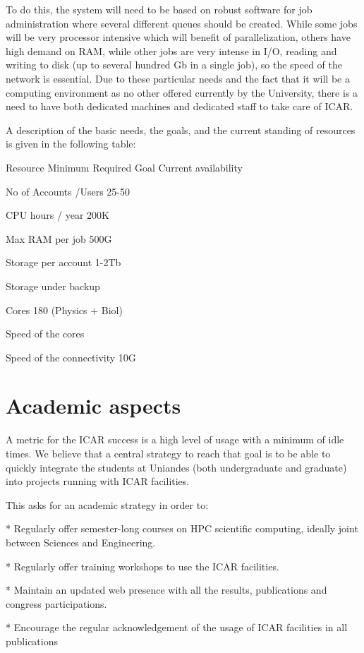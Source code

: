 \documentclass{article}
\begin{document}
To do this, the system will need to be based on robust software for job administration where several different queues should be created. While some jobs will be very processor intensive which will benefit of parallelization, others have high demand on RAM, while other jobs are very intense in I/O, reading and writing to disk (up to several hundred Gb in a single job), so the speed of the network is essential. Due to these particular needs and the fact that it will be a computing environment as no other offered currently by the University, there is a need to have both dedicated machines and dedicated staff to take care of ICAR.

A description of the basic needs, the goals, and the current standing of resources is given in the following table:

Resource Minimum Required Goal Current availability

No of Accounts /Users 25-50

CPU hours / year 200K

Max RAM per job 500G

Storage per account 1-2Tb

Storage under backup

Cores 180 (Physics + Biol)

Speed of the cores

Speed of the connectivity 10G

\section{Academic aspects}

A metric for the ICAR success is a high level of usage with a minimum of idle times. We believe that a central strategy to reach that goal is to be able to quickly integrate the students at Uniandes (both undergraduate and graduate) into projects running with ICAR facilities.

This asks for an academic strategy in order to:

* Regularly offer semester-long courses on HPC scientific computing, ideally joint between Sciences and Engineering.

* Regularly offer training workshops to use the ICAR facilities.

* Maintain an updated web presence with all the results, publications and congress participations.

* Encourage the regular acknowledgement of the usage of ICAR facilities in all publications
\end{document}
